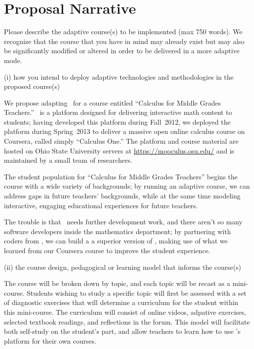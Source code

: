 \section{Proposal Narrative}


\begin{question}
Please describe the adaptive course(s) to be implemented (max 750
words). We recognize that the course that you have in mind may
already exist but may also be significantly modified or altered in
order to be delivered in a more adaptive mode.
\end{question}

\begin{question}
 (i) how you intend to deploy adaptive technologies and methodologies
 in the proposed course(s)
\end{question}

We propose adapting \mooculus\ for a course entitled ``Calculus for
Middle Grades Teachers.''  \mooculus\ is a platform designed for
delivering interactive math content to students; having developed this
platform during Fall~2012, we deployed the platform during Spring~2013
to deliver a massive open online calculus course on Coursera, called
simply ``Calculus One.''  The platform and course material are hosted
on Ohio State University servers at \url{https://mooculus.osu.edu/}
and is maintained by a small team of researchers.  

The student population for ``Calculus for Middle Grades Teachers''
begins the course with a wide variety of backgrounds; by running an
adaptive course, we can address gaps in future teachers' backgrounds,
while at the same time modeling interactive, engaging educational
experiences for future teachers.

The trouble is that \mooculus\ needs further development work, and
there aren't so many software developers inside the mathematics
department; by partnering with coders from \gratisu, we can build a a
superior version of \mooculus, making use of what we learned from our
Coursera course to improve the student experience.

\begin{question}
 (ii) the course design, pedagogical or learning model that informs
 the course(s)
\end{question}

The course will be broken down by topic, and each topic will be recast
as a mini-course.  Students wishing to study a specific topic will
first be assessed with a set of diagnostic exercises that will
determine a curriculum for the student within this mini-course.  The
curriculum will consist of online videos, adpative exercises, selected
textbook readings, and reflections in the forum.  This model will
facilitate both self-study on the student's part, and allow teachers
to learn how to use \gratisu's platform for their own courses.

